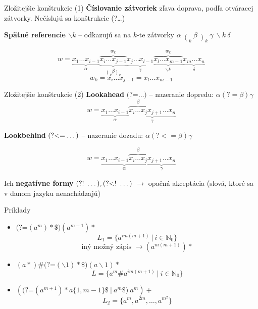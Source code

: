 \documentclass[mathserif]{beamer}
\def\N{\mathds{N}} %
\def\lookahead{\text{(?=}}
\def\nlookahead{\text{(?!~}}
\def\lookbehind{\text{(?\textless =}}
\def\nlookbehind{\text{(?\textless !~}}
\begin{document}
\begin{frame}{Zložitejšie konštrukcie (1)}
\textbf{Číslovanie zátvoriek} zľava doprava, podľa otváracej zátvorky. Nečíslujú sa konštrukcie (?\dots)

\vspace{20pt}
\textbf{Spätné referencie $\backslash k$} -- odkazujú sa na $k$-te zátvorky
$\displaystyle \alpha~ \mathop(_k ~\beta ~\mathop)_k ~\gamma ~\backslash k ~\delta$

$$w = \underbrace{x_1\dots x_{i-1}}_\alpha 
 \overbrace{\underbrace{x_i\dots x_{j-1}}_{ \displaystyle{\mathop(_k\beta \mathop)_k}}}^{w_k} 
 \underbrace{x_j\dots x_{l-1}}_\gamma 
 \overbrace{\underbrace{x_l\dots x_{m-1}}_{\backslash k}}^{w_k}
 \underbrace{x_{m}\dots x_{n}}_\delta$$
\vspace{10pt} 
$$ w_k = x_i\dots x_{j-1} = x_l\dots x_{m-1} $$

\end{frame}
\begin{frame}{Zložitejšie konštrukcie (2)}
\textbf{Lookahead} $\lookahead\dots)$ -- nazeranie dopredu:
$\alpha(?=\beta)\gamma$ $$w = \underbrace{x_1\dots x_{i-1}}_\alpha \underbrace{\overbrace{x_i \dots x_j}^\beta x_{j+1} \dots x_n }_\gamma$$ 

\textbf{Lookbehind} $\lookbehind\dots)$ -- nazeranie dozadu: $\alpha(?<=\beta)\gamma$

$$w = \underbrace{x_1\dots x_{i-1} \overbrace{x_i \dots x_j}^\beta}_\alpha \underbrace{x_{j+1} \dots x_n }_\gamma$$

Ich \textbf{negatívne formy} $\nlookahead\dots),\nlookbehind\dots)$ $\rightarrow$ opačná akceptácia (slová, ktoré sa v danom jazyku nenachádzajú)
\end{frame}

\begin{frame}{Príklady}
\begin{itemize}
\item ${\lookahead (a^m)*\$)(a^{m+1})*}$
$$L_1 = \lbrace a^{im(m+1)}~|~i\in\N_0\rbrace$$
$$\text{iný možný zápis } \rightarrow (a^{m(m+1)})*$$
\item $(a*)\#\lookahead(\backslash 1)*\$)(a\backslash 1)*$
$$L = \lbrace a^m\# a^{im(m+1)} ~|~ i\in\N_0\rbrace$$
\vspace{10pt}
\item ${ \left(\lookahead (a^{m+1})* a\lbrace 1,m-1\rbrace \$ ~|~ a^m \$)~ a^m\right)+ }$
$$L_2 = \lbrace a^m,a^{2m}, \dots, a^{m^2} \rbrace$$
\end{itemize}
\end{frame}
\end{document}
